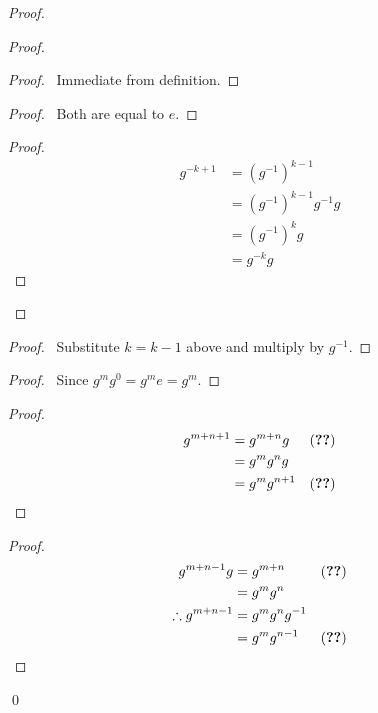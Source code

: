 \begin{proof}
    \pf
    \begin{proof}
        \begin{proof}
            \pf\ Immediate from definition.
        \end{proof}
        \begin{proof}
            \pf\ Both are equal to $e$.
        \end{proof}
        \begin{proof}
            \pf
            \begin{align*}
                g^{-k+1} & = (g^{-1})^{k-1}          \\
                         & = (g^{-1})^{k-1} g^{-1} g \\
                         & = (g^{-1})^k g            \\
                         & = g^{-k} g
            \end{align*}
        \end{proof}
    \end{proof}
    \begin{proof}
        \pf\ Substitute $k = k-1$ above and multiply by $g^{-1}$.
    \end{proof}
    \begin{proof}
        \pf\ Since $g^m g^0 = g^m e = g^m$.
    \end{proof}
    \begin{proof}
        \pf
        \begin{align*}
            g^{m+n+1} & = g^{m+n} g   & (\text{\stepref{1}}) \\
                      & = g^m g^n g                          \\
                      & = g^m g^{n+1} & (\text{\stepref{1}})
        \end{align*}
    \end{proof}
    \begin{proof}
        \pf
        \begin{align*}
            g^{m+n-1} g          & = g^{m+n}        & (\text{\stepref{1}}) \\
                                 & = g^m g^n                               \\
            \therefore g^{m+n-1} & = g^m g^n g^{-1}                        \\
                                 & = g^m g^{n-1}    & (\text{\stepref{2}})
        \end{align*}
    \end{proof}
    \qed
\end{proof}

